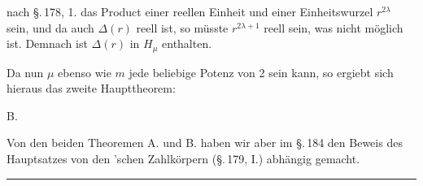 nach \S.\,178, 1. das Product einer reellen Einheit und einer
Einheitswurzel $r^{2\lambda}$ sein, und da auch $\Delta(r)$
reell ist, so müsste $r^{2\lambda+1}$ reell sein, was nicht
möglich ist. Demnach ist $\Delta(r)$ in $H_\mu$ enthalten.

Da nun $\mu$ ebenso wie $m$ jede beliebige Potenz von 2 sein
kann, so ergiebt sich hieraus das zweite Haupttheorem:

B. 

Von den beiden Theoremen A. und B. haben wir aber im \S.\,184
den Beweis des Hauptsatzes von den 'schen Zahlkörpern
(\S.\,179, I.) abhängig gemacht.

\begin{center}
\rule{4cm}{0.4pt}
\end{center}
